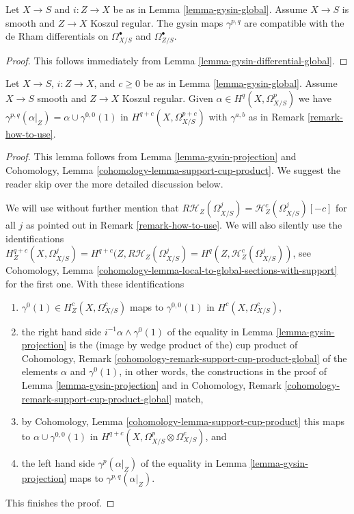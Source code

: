 \begin{lemma}
\label{lemma-gysin-differential-hodge}
Let $X \to S$ and $i : Z \to X$ be as in Lemma \ref{lemma-gysin-global}.
Assume $X \to S$ is smooth and $Z \to X$ Koszul regular.
The gysin maps $\gamma^{p, q}$ are compatible with the de Rham
differentials on $\Omega^\bullet_{X/S}$ and $\Omega^\bullet_{Z/S}$.
\end{lemma}

\begin{proof}
This follows immediately from
Lemma \ref{lemma-gysin-differential-global}.
\end{proof}

\begin{lemma}
\label{lemma-gysin-projection-global}
Let $X \to S$, $i : Z \to X$, and $c \geq 0$ be as in
Lemma \ref{lemma-gysin-global}. Assume $X \to S$ smooth and
$Z \to X$ Koszul regular. Given $\alpha \in H^q(X, \Omega^p_{X/S})$ we have
$\gamma^{p, q}(\alpha|_Z) = \alpha \cup \gamma^{0, 0}(1)$ in
$H^{q + c}(X, \Omega^{p + c}_{X/S})$ with $\gamma^{a, b}$ as in
Remark \ref{remark-how-to-use}.
\end{lemma}

\begin{proof}
This lemma follows from Lemma \ref{lemma-gysin-projection}
and Cohomology, Lemma \ref{cohomology-lemma-support-cup-product}.
We suggest the reader skip over the more detailed discussion below.

\medskip\noindent
We will use without further mention that
$R\mathcal{H}_Z(\Omega^j_{X/S}) = \mathcal{H}^c_Z(\Omega^j_{X/S})[-c]$
for all $j$ as pointed out in Remark \ref{remark-how-to-use}.
We will also silently use the identifications
$H^{q + c}_Z(X, \Omega^j_{X/S}) = H^{q + c}(Z, R\mathcal{H}_Z(\Omega^j_{X/S}) =
H^q(Z, \mathcal{H}^c_Z(\Omega^j_{X/S}))$, see
Cohomology, Lemma \ref{cohomology-lemma-local-to-global-sections-with-support}
for the first one. With these identifications
\begin{enumerate}
\item $\gamma^0(1) \in H^c_Z(X, \Omega^c_{X/S})$ maps to $\gamma^{0, 0}(1)$
in $H^c(X, \Omega^c_{X/S})$,
\item the right hand side $i^{-1}\alpha \wedge \gamma^0(1)$
of the equality in Lemma \ref{lemma-gysin-projection}
is the (image by wedge product of the) cup product of
Cohomology, Remark \ref{cohomology-remark-support-cup-product-global} 
of the elements $\alpha$ and $\gamma^0(1)$, in other words, the constructions
in the proof of Lemma \ref{lemma-gysin-projection} and in
Cohomology, Remark \ref{cohomology-remark-support-cup-product-global} match,
\item by Cohomology, Lemma \ref{cohomology-lemma-support-cup-product}
this maps to $\alpha \cup \gamma^{0, 0}(1)$ in
$H^{q + c}(X, \Omega^p_{X/S} \otimes \Omega^c_{X/S})$, and
\item the left hand side $\gamma^p(\alpha|_Z)$ of the equality in
Lemma \ref{lemma-gysin-projection} maps to
$\gamma^{p, q}(\alpha|_Z)$.
\end{enumerate}
This finishes the proof.
\end{proof}

